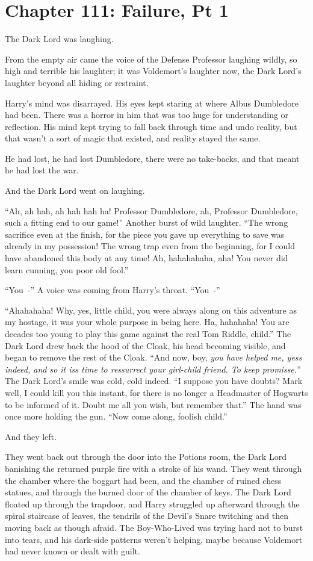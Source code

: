 \chapter{Chapter 111: Failure, Pt 1}
The Dark Lord was laughing.

From the empty air came the voice of the Defense Professor laughing wildly, so high and terrible his laughter; it was Voldemort's laughter now, the Dark Lord's laughter beyond all hiding or restraint.

Harry's mind was disarrayed. His eyes kept staring at where Albus Dumbledore had been. There was a horror in him that was too huge for understanding or reflection. His mind kept trying to fall back through time and undo reality, but that wasn't a sort of magic that existed, and reality stayed the same.

He had lost, he had lost Dumbledore, there were no take-backs, and that meant he had lost the war.

And the Dark Lord went on laughing.

``Ah, ah hah, ah hah hah ha! Professor Dumbledore, ah, Professor Dumbledore, such a fitting end to our game!'' Another burst of wild laughter. ``The wrong sacrifice even at the finish, for the piece you gave up everything to save was already in my possession! The wrong trap even from the beginning, for I could have abandoned this body at any time! Ah, hahahahaha, aha! You never did learn cunning, you poor old fool.''

``You~-'' A voice was coming from Harry's throat. ``You~-''

``Ahahahaha! Why, yes, little child, you were always along on this adventure as my hostage, it was your whole purpose in being here. Ha, hahahaha! You are decades too young to play this game against the real Tom Riddle, child.'' The Dark Lord drew back the hood of the Cloak, his head becoming visible, and began to remove the rest of the Cloak. ``And now, boy, \emph{you have helped me, yess indeed, and so it iss time to ressurrect your girl-child friend. To keep promisse.}'' The Dark Lord's smile was cold, cold indeed. ``I suppose you have doubts? Mark well, I could kill you this instant, for there is no longer a Headmaster of Hogwarts to be informed of it. Doubt me all you wish, but remember that.'' The hand was once more holding the gun. ``Now come along, foolish child.''

And they left.

They went back out through the door into the Potions room, the Dark Lord banishing the returned purple fire with a stroke of his wand. They went through the chamber where the boggart had been, and the chamber of ruined chess statues, and through the burned door of the chamber of keys. The Dark Lord floated up through the trapdoor, and Harry struggled up afterward through the spiral staircase of leaves, the tendrils of the Devil's Snare twitching and then moving back as though afraid. The Boy-Who-Lived was trying hard not to burst into tears, and his dark-side patterns weren't helping, maybe because Voldemort had never known or dealt with guilt.

